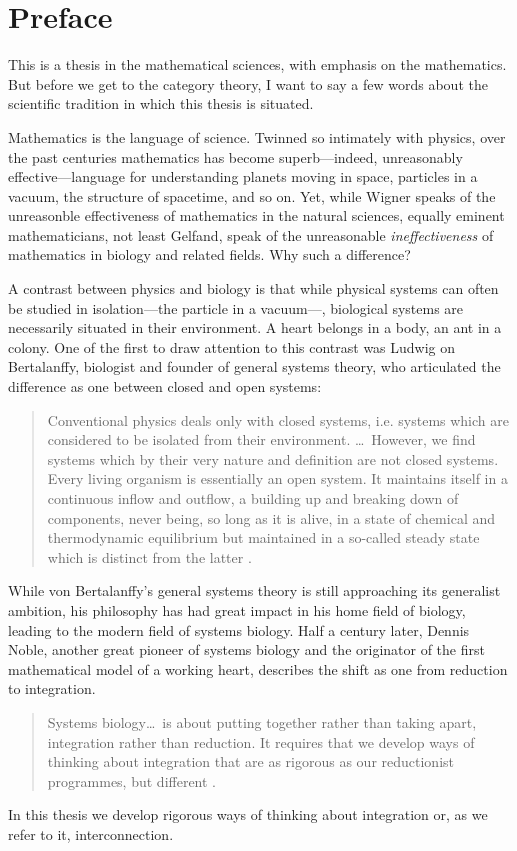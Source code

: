 {}
\chapter*{Preface}

This is a thesis in the mathematical sciences, with emphasis on the mathematics.
But before we get to the category theory, I want to say a few words about the
scientific tradition in which this thesis is situated.

Mathematics is the language of science. Twinned so intimately with physics, over
the past centuries mathematics has become superb---indeed, unreasonably
effective---language for understanding planets moving in space, particles in a
vacuum, the structure of spacetime, and so on.  Yet, while Wigner speaks of the
unreasonble effectiveness of mathematics in the natural sciences, equally
eminent mathematicians, not least Gelfand, speak of the unreasonable
\emph{ineffectiveness} of mathematics in biology and related fields. Why such a
difference?

A contrast between physics and biology is that while physical systems can often
be studied in isolation---the particle in a vacuum---, biological systems are
necessarily situated in their environment. A heart belongs in a body, an ant in
a colony. One of the first to draw attention to this contrast was Ludwig on
Bertalanffy, biologist and founder of general systems theory, who articulated
the difference as one between closed and open systems: 
\begin{quote}
  Conventional physics deals only with closed systems, i.e. systems which are
  considered to be isolated from their environment. \dots\ However, we find
  systems which by their very nature and definition are not closed systems.
  Every living organism is essentially an open system. It maintains itself in a
  continuous inflow and outflow, a building up and breaking down of components,
  never being, so long as it is alive, in a state of chemical and thermodynamic
  equilibrium but maintained in a so-called steady state which is distinct from
  the latter \cite{Ber68}.
\end{quote}
While von Bertalanffy's general systems theory is still approaching its
generalist ambition, his philosophy has had great impact in his home field of
biology, leading to the modern field of systems biology. Half a century later,
Dennis Noble, another great pioneer of systems biology and the originator of the
first mathematical model of a working heart, describes the shift as one from
reduction to integration.
\begin{quote}
  Systems biology\dots\ is about putting together rather than taking apart,
  integration rather than reduction. It requires that we develop ways of
  thinking about integration that are as rigorous as our reductionist
  programmes, but different \cite{Nob06}.
\end{quote}
In this thesis we develop rigorous ways of thinking about integration or, as we
refer to it, interconnection.

